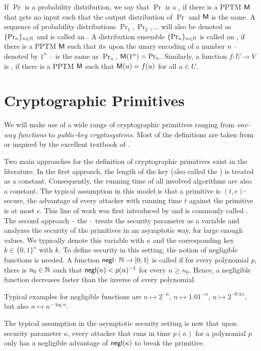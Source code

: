 If $\Pr$ is a probability distribution, we say
that $\Pr$ is a , if there is a \ac{PPTM}
$\mathsf{M}$ that gets no input such that the output distribution of
$\Pr$ and $\mathsf{M}$ is the same. A sequence of probability
distributions $\Pr_{1},\Pr_{2},\ldots$ will also be denoted as
$\{\Pr_{n}\}_{n\in \mathbb{N}}$ and is called an . A
distribution ensemble $\{\Pr_{n}\}_{n\in \mathbb{N}}$ is called an , if there is a \ac{PPTM} $\mathsf{M}$ such that
its upon the unary encoding of a number $n$ -- denoted by $1^{n}$ -- is
the same as $\Pr_{n}$, \ie $\mathsf{M}(1^{n})=\Pr_{n}$. 
Similarly, a function $f\colon U\to V$ is , if there is a \ac{PPTM} $\mathsf{M}$ such that
$\mathsf{M}(u)=f(u)$ for all $u\in U$. 

\section{Cryptographic Primitives}
We will make use of a wide range of cryptographic primitives ranging
from \emph{one-way functions} to \emph{public-key cryptosystems}. Most
of the definitions are taken from or inspired by the excellent textbook
of \citeauthor{lindell2007introduction}
\cite{lindell2007introduction}. 

Two
main approaches for the definition of cryptographic primitives exist in
the literature. In the first approach, the length of the key (also
called the ) is treated as a
constant. Consequently, the running time of all involved algorithms are
also a constant. The typical assumption in this model is that a
primitive is $(t,\epsilon)$-secure, \ie the advantage of every attacker 
with running time $t$ against the primitive is at most $\epsilon$. This
line of work was first introduced by \citeauthor{bellare1997concrete}
and is commonly called 
\cite{bellare1997concrete}. 
 The second approach -- the  -- treats the security parameter as a variable and analyzes
the security of the primitives in an asymptotic way, \ie for large
enough values. We typically denote this variable with $\kappa$ and the
corresponding key $k\in \{0,1\}^{\kappa}$ with $k$.
To define security in this setting, the notion of
negligible functions is needed. A function $\operatorname{\mathsf{negl}}\colon \mathbb{N}\to [0,1]$
is called  if for every polynomial $p$, there is
$n_{0}\in \mathbb{N}$ such that $\operatorname{\mathsf{negl}}(n) < p(n)^{-1}$ for every
$n\geq n_{0}$. Hence, a negligible function decreases faster than the
inverse of every polynomial. 
\begin{example}
  Typical examples for negligible functions are $n\mapsto 2^{-n}$,
  $n\mapsto 1{.}01^{-n}$,  $n\mapsto 2^{-0{.}1n}$, but also $n\mapsto
  n^{-\log n}$. 
\end{example}
The typical assumption in the asymptotic security setting is now that
upon security parameter $\kappa$, every attacker that runs in time $p(\kappa)$ for
a polynomial $p$ only has a negligible advantage of $\operatorname{\mathsf{negl}}(\kappa)$ to break the
primitive. 

